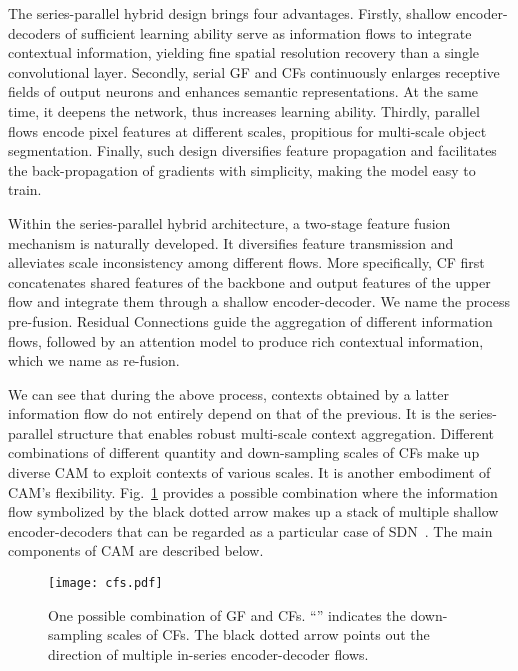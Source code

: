 \documentclass[journal]{IEEEtran}
\begin{document}
The series-parallel hybrid design brings four advantages. Firstly, shallow encoder-decoders of sufficient learning ability serve as information flows to integrate contextual information, yielding fine spatial resolution recovery than a single convolutional layer. Secondly, serial GF and CFs continuously enlarges receptive fields of output neurons and enhances semantic representations. At the same time, it deepens the network, thus increases learning ability. Thirdly, parallel flows encode pixel features at different scales, propitious for multi-scale object segmentation. Finally, such design diversifies feature propagation and facilitates the back-propagation of gradients with simplicity, making the model easy to train.

Within the series-parallel hybrid architecture, a two-stage feature fusion mechanism is naturally developed. It diversifies feature transmission and alleviates scale inconsistency among different flows. More specifically, CF first concatenates shared features of the backbone and output features of the upper flow and integrate them through a shallow encoder-decoder. We name the process pre-fusion. Residual Connections guide the aggregation of different information flows, followed by an attention model to produce rich contextual information, which we name as re-fusion.

We can see that during the above process, contexts obtained by a latter information flow do not entirely depend on that of the previous. It is the series-parallel structure that enables robust multi-scale context aggregation. Different combinations of different quantity and down-sampling scales of CFs make up diverse CAM to exploit contexts of various scales. It is another embodiment of CAM's flexibility. Fig.~\ref{fig:cfs_example} provides a possible combination where the information flow symbolized by the black dotted arrow makes up a stack of multiple shallow encoder-decoders that can be regarded as a particular case of SDN~\cite{fu2019stacked}. The main components of CAM are described below.

\begin{figure}[t]
\begin{center}
\texttt{[image: cfs.pdf]}
\end{center}
\caption{One possible combination of GF and CFs. ``'' indicates the down-sampling scales of CFs. The black dotted arrow points out the direction of multiple in-series encoder-decoder flows.}
\label{fig:cfs_example}
\end{figure}
\end{document}
